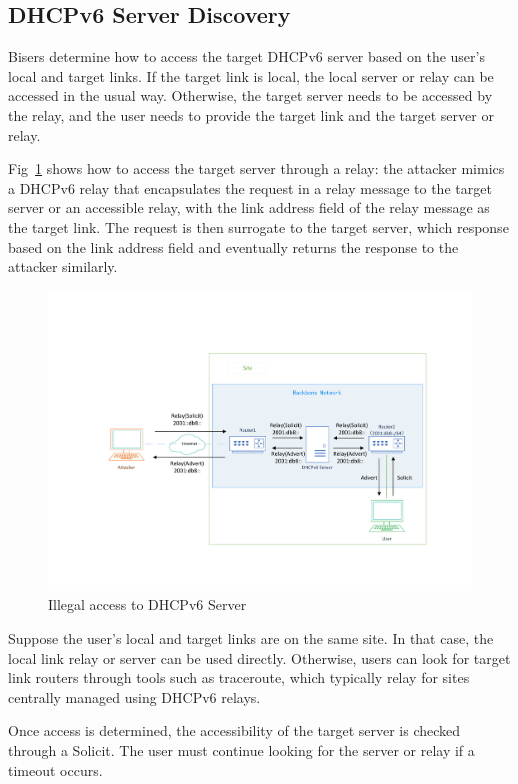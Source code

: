 \documentclass[conference]{IEEEtran}
\begin{document}
\subsection{DHCPv6 Server Discovery}

Bisers determine how to access the target DHCPv6 server based on the
user's local and target links. If the target link is local, the local
server or relay can be accessed in the usual way. Otherwise, the
target server needs to be accessed by the relay, and the user needs to
provide the target link and the target server or relay.

Fig~\ref{figRelay2} shows how to access the target server through a
relay: the attacker mimics a DHCPv6 relay that encapsulates the
request in a relay message to the target server or an accessible
relay, with the link address field of the relay message as the target
link. The request is then surrogate to the target server, which
response based on the link address field and eventually returns the
response to the attacker similarly.

\begin{figure}[tbp]
  \centerline{\includegraphics[scale=0.33]{relay2.pdf}}
  \caption{Illegal access to DHCPv6 Server}
  \label{figRelay2}
\end{figure}

Suppose the user's local and target links are on the same site. In
that case, the local link relay or server can be used
directly. Otherwise, users can look for target link routers through
tools such as traceroute, which typically relay for sites centrally
managed using DHCPv6 relays.

Once access is determined, the accessibility of the target server is
checked through a Solicit. The user must continue looking for the
server or relay if a timeout occurs.
\end{document}
